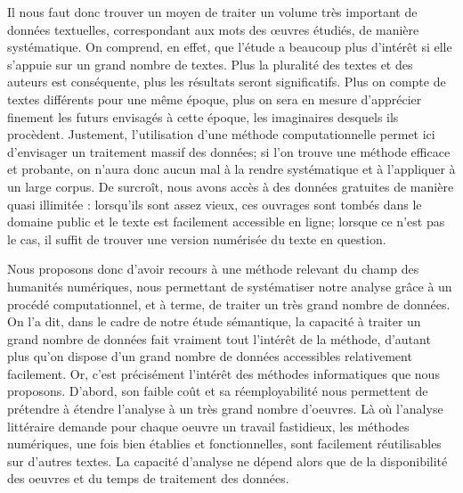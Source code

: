 \documentclass[letterpaper,portrait,12pt]{article}
\begin{document}
	Il nous faut donc trouver un moyen de traiter un volume tr\`{e}s important de donn\'{e}es textuelles, correspondant aux mots des \oe{}uvres \'{e}tudi\'{e}s, de mani\`{e}re syst\'{e}matique. On comprend, en effet, que l'\'{e}tude a beaucoup plus d'int\'{e}r\^{e}t si elle s'appuie sur un grand nombre de textes. Plus la pluralit\'{e} des textes et des auteurs est cons\'{e}quente, plus les r\'{e}sultats seront significatifs. Plus on compte de textes diff\'{e}rents pour une m\^{e}me \'{e}poque, plus on sera en mesure d'appr\'{e}cier finement les futurs envisag\'{e}s \`{a} cette \'{e}poque, les imaginaires desquels ils proc\`{e}dent. Justement, l'utilisation d'une m\'{e}thode computationnelle permet ici d'envisager un traitement massif des donn\'{e}es; si l'on trouve une m\'{e}thode efficace et probante, on n'aura donc aucun mal \`{a} la rendre syst\'{e}matique et \`{a} l'appliquer \`{a} un large corpus. De surcro\^{i}t, nous avons acc\`{e}s \`{a} des donn\'{e}es gratuites de mani\`{e}re quasi illimit\'{e}e : lorsqu'ils sont assez vieux, ces ouvrages sont tomb\'{e}s dans le domaine public et le texte est facilement accessible en ligne; lorsque ce n'est pas le cas, il suffit de trouver une version num\'{e}ris\'{e}e du texte en question.





	Nous proposons donc d'avoir recours \`{a} une m\'{e}thode relevant du champ des humanit\'{e}s num\'{e}riques, nous permettant de syst\'{e}matiser notre analyse gr\^{a}ce \`{a} un proc\'{e}d\'{e} computationnel, et \`{a} terme, de traiter un tr\`{e}s grand nombre de donn\'{e}es. On l'a dit, dans le cadre de notre \'{e}tude s\'{e}mantique, la capacit\'{e} \`{a} traiter un grand nombre de donn\'{e}es fait vraiment tout l'int\'{e}r\^{e}t de la m\'{e}thode, d'autant plus qu'on dispose d'un grand nombre de donn\'{e}es accessibles relativement facilement. Or, c'est pr\'{e}cis\'{e}ment l'int\'{e}r\^{e}t des m\'{e}thodes informatiques que nous proposons. D'abord, son faible co\^{u}t et sa r\'{e}employabilit\'{e} nous permettent de pr\'{e}tendre \`{a} \'{e}tendre l'analyse \`{a} un tr\`{e}s grand nombre d'oeuvres. L\`{a} où l'analyse litt\'{e}raire demande pour chaque oeuvre un travail fastidieux, les m\'{e}thodes num\'{e}riques, une fois bien \'{e}tablies et fonctionnelles, sont facilement r\'{e}utilisables sur d'autres textes. La capacit\'{e} d'analyse ne d\'{e}pend alors que de la disponibilit\'{e} des oeuvres et du temps de traitement des donn\'{e}es. 
\end{document}
